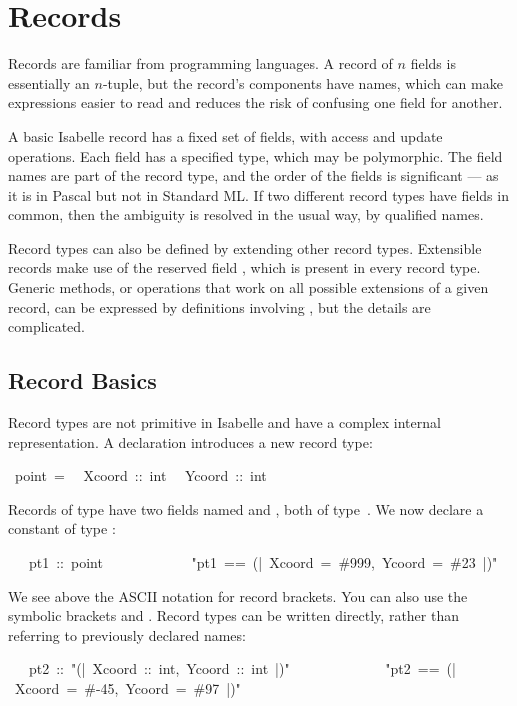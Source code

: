\section{Records} 
\label{sec:records}

%
Records are familiar from programming languages.  A record of $n$
fields is essentially an $n$-tuple, but the record's components have
names, which can make expressions easier to read and reduces the risk
of confusing one field for another.

A basic Isabelle record has a fixed set of fields, with access
and update operations.  Each field has a specified type, which may be
polymorphic.  The field names are part of the record type, and the
order of the fields is significant --- as it is in Pascal but not in
Standard ML.  If two different record types have fields in common,
then the ambiguity is resolved in the usual way, by qualified names.

Record types can also be defined by extending other record types. 
Extensible records make use of the reserved field , which is
present in every record type.  Generic methods, or operations that
work on all possible extensions of a given record, can be expressed by
definitions involving , but the details are complicated.

\subsection{Record Basics}

Record types are not primitive in Isabelle and have a complex internal
representation.  A  declaration
introduces a new record type:
\begin{isabelle}
\ point\ =\isanewline
\ \ Xcoord\ ::\ int\isanewline
\ \ Ycoord\ ::\ int
\end{isabelle}

Records of type  have two fields named  and ,
both of type~.  We now declare a constant of type
:
\begin{isabelle}
\ \ \ pt1\ ::\ point\isanewline
\ \ \ \ \ \ \ \ \ \ \ \ "pt1\ ==\ (|\ Xcoord\ =\ \#999,\ Ycoord\ =\ \#23\ |)"
\end{isabelle}
We see above the ASCII notation for record brackets.  You can also use
the symbolic brackets \isa{\isasymlparr} and  \isa{\isasymrparr}.
Record types can be written directly, rather than referring to
previously declared names: 
\begin{isabelle}
\ \ \ pt2\ ::\ "(|\ Xcoord\ ::\ int,\ Ycoord\ ::\ int\
|)"\ \isanewline
\ \ \ \ \ \ \ \ \ \ \ \ "pt2\ ==\ (|\ Xcoord\ =\ \#-45,\ Ycoord\ =\ \#97\ |)"
\end{isabelle}

